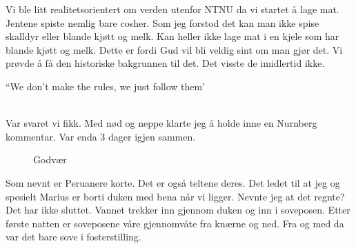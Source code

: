 Vi ble litt realitetsorientert om 
verden utenfor NTNU da vi startet å
lage mat. Jentene spiste nemlig bare cosher. Som jeg forstod det kan
man ikke spise skalldyr eller blande kjøtt og melk. Kan heller ikke
lage mat i en kjele som har blande kjøtt og melk. Dette er fordi Gud
vil bli veldig sint om man gjør det. Vi prøvde å få den historiske
bakgrunnen til det. Det visste de imidlertid ikke.\\ 
\begin{dialogue}
	\item ``We don't make the rules, we just follow them'
\end{dialogue}\\
Var svaret vi fikk. Med nød og neppe klarte jeg å
holde inne en Nurnberg kommentar. Var enda 3 dager igjen sammen.\\
       
\begin{figure}[!h]
	\centering
\noindent{}%
	\caption*{Godvær}
\label{fig:godvaer}
\end{figure}

Som nevnt er Peruanere korte. Det er også teltene deres. Det
ledet til at jeg og spesielt Marius er borti duken med bena når vi
ligger. Nevnte jeg at det regnte? Det har ikke sluttet. Vannet trekker
inn gjennom duken og inn i
soveposen. Etter første natten er soveposene våre gjennomvåte fra
knærne og ned. Fra og med da var det bare sove i fosterstilling. \\

